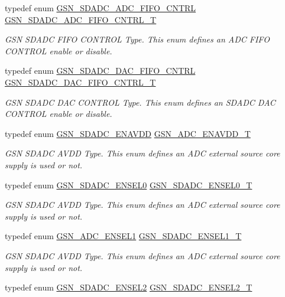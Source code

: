 \begin{DoxyCompactItemize}
typedef enum \hyperlink{a00652_ga2935ec509d4dbac8b79ee30623d4c11f}{GSN\_\-SDADC\_\-ADC\_\-FIFO\_\-CNTRL} \hyperlink{a00652_gaf55aace91b55b8544afeb27482cc70d4}{GSN\_\-SDADC\_\-ADC\_\-FIFO\_\-CNTRL\_\-T}
\begin{DoxyCompactList}\small\item\em GSN SDADC FIFO CONTROL Type. This enum defines an ADC FIFO CONTROL enable or disable. \end{DoxyCompactList}\item 
typedef enum \hyperlink{a00652_ga3309e966fa4f0d2d297dae6a3bed9599}{GSN\_\-SDADC\_\-DAC\_\-FIFO\_\-CNTRL} \hyperlink{a00652_ga1a95b10a6598d0019aec9049a8e37f19}{GSN\_\-SDADC\_\-DAC\_\-FIFO\_\-CNTRL\_\-T}
\begin{DoxyCompactList}\small\item\em GSN SDADC DAC CONTROL Type. This enum defines an SDADC DAC CONTROL enable or disable. \end{DoxyCompactList}\item 
typedef enum \hyperlink{a00652_gadec6c3ec131e3065cf2061534dfdb320}{GSN\_\-SDADC\_\-ENAVDD} \hyperlink{a00652_ga46353c29cf1b862e0ab85b39b68176af}{GSN\_\-ADC\_\-ENAVDD\_\-T}
\begin{DoxyCompactList}\small\item\em GSN SDADC AVDD Type. This enum defines an ADC external source core supply is used or not. \end{DoxyCompactList}\item 
typedef enum \hyperlink{a00652_ga6258977695af5f9fbae5edbdc75d8387}{GSN\_\-SDADC\_\-ENSEL0} \hyperlink{a00652_ga00d5cf84ae6ccebc46f9cd2c1bb63af0}{GSN\_\-SDADC\_\-ENSEL0\_\-T}
\begin{DoxyCompactList}\small\item\em GSN SDADC AVDD Type. This enum defines an ADC external source core supply is used or not. \end{DoxyCompactList}\item 
typedef enum \hyperlink{a00652_ga7c8cd0e1bbc6163fd01b12c7f31f0550}{GSN\_\-ADC\_\-ENSEL1} \hyperlink{a00652_ga9cf5d5c5ebe5edb5cda45eb9a6e466ef}{GSN\_\-SDADC\_\-ENSEL1\_\-T}
\begin{DoxyCompactList}\small\item\em GSN SDADC AVDD Type. This enum defines an ADC external source core supply is used or not. \end{DoxyCompactList}\item 
typedef enum \hyperlink{a00652_ga940370ff6d2765c622f7687f6e6eee6a}{GSN\_\-SDADC\_\-ENSEL2} \hyperlink{a00652_gae94467e442a092eb6c551e3076850d12}{GSN\_\-SDADC\_\-ENSEL2\_\-T}

\end{DoxyCompactItemize}
